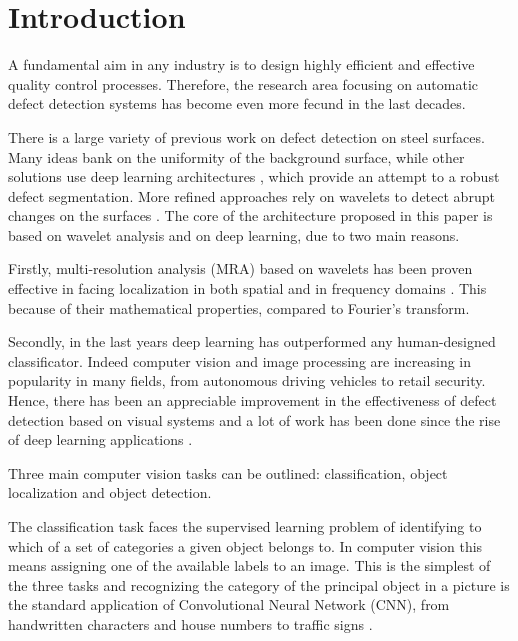 \section{Introduction}
    \par{
        A fundamental aim in any industry is to design highly efficient and effective quality control processes. Therefore, the research area focusing on automatic defect detection systems has become even more fecund in the last decades. 
    }
    \par{
        There is a large variety of previous work on defect detection on steel surfaces. Many ideas \cite{ieee:4777721, ieee:7030439, ieee:8623728} bank on the uniformity of the background surface, while other solutions use deep learning architectures \cite{ieee:1334512, ieee:6738559}, which provide an attempt to a robust defect segmentation. More refined approaches rely on wavelets to detect abrupt changes on the surfaces \cite{ieee:993164, ieee:6703333, ieee:7155940, sciencedirect:NGAN2011442}. The core of the architecture proposed in this paper is based on wavelet analysis and on deep learning, due to two main reasons.
    }
    \par{
        Firstly, multi-resolution analysis (MRA) based on wavelets has been proven effective in facing localization in both spatial and in frequency domains \cite{Vetterli:1995:WSC:201007, Daubechies:1992:TLW:130655, intechopen:bernardini}. This because of their mathematical properties, compared to Fourier's transform.
    }
    \par{
        Secondly, in the last years deep learning \cite{Goodfellow:2016:DL:3086952, Rojas:1996:NNS:235222} has outperformed any human-designed classificator. Indeed computer vision and image processing are increasing in popularity in many fields, from autonomous driving vehicles to retail security. Hence, there has been an appreciable improvement in the effectiveness of defect detection based on visual systems and a lot of work has been done since the rise of deep learning applications \cite{researchgate:deeplearning}.
    }
    \par{
        Three main computer vision tasks can be outlined: classification, object localization and object detection.
    }
    \par{
        The classification task faces the supervised learning problem of identifying to which of a set of categories a given object belongs to. In computer vision this means assigning one of the available labels to an image. This is the simplest of the three tasks and recognizing the category of the principal object in a picture is the standard application of Convolutional Neural Network (CNN), from handwritten characters \cite{nips:NIPS1989_293, ieee:6248110} and house numbers \cite{ieee:6460867} to traffic signs \cite{ieee:6248110}.

    }
